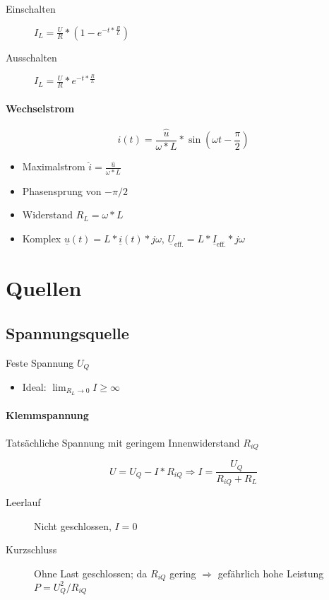 \begin{description}
  \item[Einschalten] $I_L = \frac{U}{R} * (1 - e^{-t * \frac{R}{L}})$
  \item[Ausschalten] $I_L = \frac{U}{R} * e^{-t * \frac{R}{L}}$
\end{description}

\paragraph{Wechselstrom}

$$i(t) = \frac{\hat{u}}{\omega * L} * \sin (\omega t - \frac{\pi}{2})$$

\begin{itemize}
  \item Maximalstrom $\hat{i} = \frac{\hat{u}}{\omega * L}$
  \item Phasensprung von $-\pi/2$
  \item Widerstand $R_L = \omega * L$
  \item Komplex $\underline{u}(t) = L * \underline{i}(t) * j\omega$, $\underline{U}_\text{eff.} = L * \underline{I}_\text{eff.} * j\omega$
\end{itemize}

\section{Quellen}

\subsection{Spannungsquelle}

Feste Spannung $U_Q$

\begin{itemize}
  \item Ideal: $\lim_{R_L \rightarrow 0} I \geq \infty$
\end{itemize}

\paragraph{Klemmspannung} Tatsächliche Spannung mit geringem Innenwiderstand $R_{iQ}$

$$U = U_Q - I * R_{iQ} \Rightarrow I = \frac{U_Q}{R_{iQ} + R_L}$$

\begin{description}
  \item[Leerlauf] Nicht geschlossen, $I = 0$
  \item[Kurzschluss] Ohne Last geschlossen; da $R_{iQ}$ gering $\Rightarrow$ gefährlich hohe Leistung $P = U_Q^2 / R_{iQ}$
\end{description}

